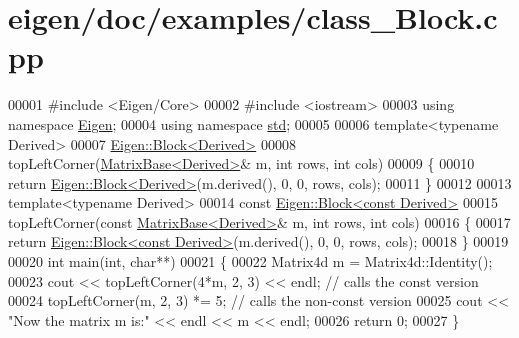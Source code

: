 \hypertarget{eigen_2doc_2examples_2class___block_8cpp_source}{}\section{eigen/doc/examples/class\+\_\+\+Block.cpp}
\label{eigen_2doc_2examples_2class___block_8cpp_source}

\begin{DoxyCode}
00001 \textcolor{preprocessor}{#include <Eigen/Core>}
00002 \textcolor{preprocessor}{#include <iostream>}
00003 \textcolor{keyword}{using namespace }\hyperlink{namespace_eigen}{Eigen};
00004 \textcolor{keyword}{using namespace }\hyperlink{namespacestd}{std};
00005 
00006 \textcolor{keyword}{template}<\textcolor{keyword}{typename} Derived>
00007 \hyperlink{group___core___module_class_eigen_1_1_block}{Eigen::Block<Derived>}
00008 topLeftCorner(\hyperlink{group___core___module_class_eigen_1_1_matrix_base}{MatrixBase<Derived>}& m, \textcolor{keywordtype}{int} rows, \textcolor{keywordtype}{int} cols)
00009 \{
00010   \textcolor{keywordflow}{return} \hyperlink{group___core___module_class_eigen_1_1_block}{Eigen::Block<Derived>}(m.derived(), 0, 0, rows, cols);
00011 \}
00012 
00013 \textcolor{keyword}{template}<\textcolor{keyword}{typename} Derived>
00014 \textcolor{keyword}{const} \hyperlink{group___core___module_class_eigen_1_1_block}{Eigen::Block<const Derived>}
00015 topLeftCorner(\textcolor{keyword}{const} \hyperlink{group___core___module_class_eigen_1_1_matrix_base}{MatrixBase<Derived>}& m, \textcolor{keywordtype}{int} rows, \textcolor{keywordtype}{int} cols)
00016 \{
00017   \textcolor{keywordflow}{return} \hyperlink{group___core___module_class_eigen_1_1_block}{Eigen::Block<const Derived>}(m.derived(), 0, 0, rows, cols);
00018 \}
00019 
00020 \textcolor{keywordtype}{int} main(\textcolor{keywordtype}{int}, \textcolor{keywordtype}{char}**)
00021 \{
00022   Matrix4d m = Matrix4d::Identity();
00023   cout << topLeftCorner(4*m, 2, 3) << endl; \textcolor{comment}{// calls the const version}
00024   topLeftCorner(m, 2, 3) *= 5;              \textcolor{comment}{// calls the non-const version}
00025   cout << \textcolor{stringliteral}{"Now the matrix m is:"} << endl << m << endl;
00026   \textcolor{keywordflow}{return} 0;
00027 \}
\end{DoxyCode}
